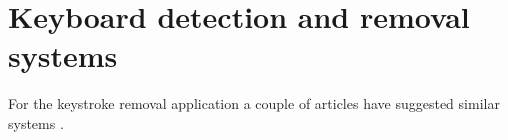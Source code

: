 %






\section{Keyboard detection and removal systems}\label{corrections:methods}
For the keystroke removal application a couple of articles have suggested similar systems \cite{Subramanya2007}\cite{Sugiyama2007}\cite{Abramson2007}\cite{Sugiyama2013}\cite{Seltzer2011Patent}.

